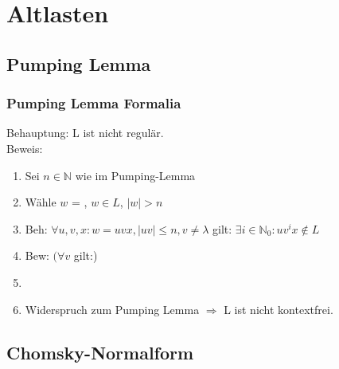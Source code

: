 


\section{Altlasten}
\subsection{Pumping Lemma}
\begin{frame}
	\frametitle{Pumping Lemma Formalia}
	Behauptung: L ist nicht regulär. ~\\
	Beweis:
	\begin{enumerate}
		\item[]Sei $n \in \mathbb{N}$ wie im Pumping-Lemma
		\item[]Wähle $w$ = \underline{\hspace{1.5 cm}}, $w \in L$, $|w| > n$
		\item[]Beh: $\forall u,v,x: w = uvx, |uv| \leq n, v \neq \lambda$ gilt: $\exists i \in \mathbb{N}_0: uv^ix \notin L$
		\item[] Bew: $(\forall v$ gilt:)\underline{\hspace{4.5 cm}}
		\item[] \hspace*{0.85 cm} \underline{\hspace{5.75 cm}}
		\item[] Widerspruch zum Pumping Lemma $\Rightarrow$ L ist nicht kontextfrei.
	\end{enumerate}
\end{frame}

\subsection{Chomsky-Normalform}

